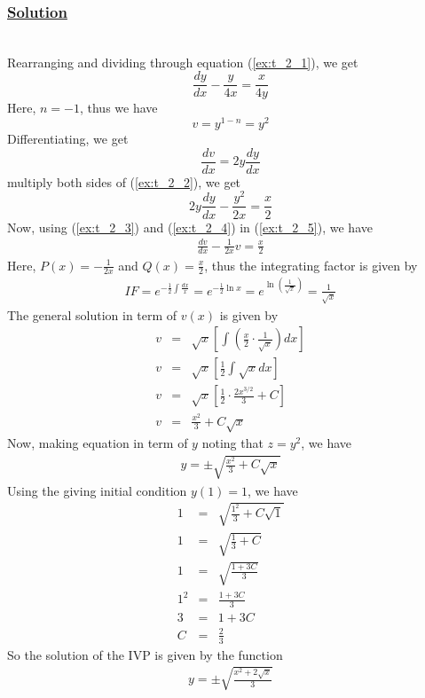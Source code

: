 \documentclass[11pt]{report}
\newcommand{\ubt}[1]{\textbf{\underline{#1}}}
\newcommand{\sps}{\\[0.2cm]}
\newcommand{\spn}[1]{\\[#1cm]}
\newcommand{\refn}[1]{(\ref{#1})}
\newcommand{\solution}{\subsubsection{\ubt{Solution}}{~}\spn{-1}}
\begin{document}
	\solution
	Rearranging and dividing through equation \refn{ex:t_2_1}, we get
	\begin{equation}
		\frac{dy}{dx}  - \frac{y}{4x} = \frac{x}{4y}\tag{2}\label{ex:t_2_2}
	\end{equation}
	Here, $n=-1$, thus we have
	\begin{equation}
		v = y^{1-n} = y^2\tag{3}\label{ex:t_2_3}
	\end{equation}
	Differentiating, we get
	\begin{equation}
		\frac{dv}{dx} = 2y\frac{dy}{dx}\tag{4}\label{ex:t_2_4}
	\end{equation}
	multiply both sides of \refn{ex:t_2_2}, we get
	\begin{equation}
		2y\frac{dy}{dx} - \frac{y^2}{2x} = \frac{x}{2}\tag{5}\label{ex:t_2_5}
	\end{equation}
	Now, using \refn{ex:t_2_3} and \refn{ex:t_2_4} in \refn{ex:t_2_5}, we have
	\begin{eqnarray*}
		\frac{dv}{dx} - \frac{1}{2x}v = \frac{x}{2}
	\end{eqnarray*}
	Here, $P(x) = -\frac{1}{2x}$ and $Q(x)=\frac{x}{2}$, thus the integrating factor is given by
	\begin{eqnarray*}
		IF = e^{-\frac{1}{2}\int\frac{dx}{x}} = e^{-\frac{1}{2}\ln x} = e^{\ln(\frac{1}{\sqrt{x}})} = \frac{1}{\sqrt{x}}
	\end{eqnarray*}
	The general solution in term of $v(x)$ is given by
	\begin{eqnarray*}
		v &=& \sqrt{x}\left[\int \left(\frac{x}{2} \cdot \frac{1}{\sqrt{x}}\right)dx\right] \sps
		v &=& \sqrt{x}\left[\frac{1}{2}\int \sqrt{x}dx\right]\sps
		v &=& \sqrt{x}\left[\frac{1}{2}\cdot \frac{2x^{3/2}}{3}+C\right]\sps
		v & =& \frac{x^2}{3} + C\sqrt{x}
	\end{eqnarray*}
	Now, making equation in term of $y$ noting that $z=y^2$, we have
	\begin{eqnarray*}
		y = \pm\sqrt{\frac{x^2}{3} + C\sqrt{x}}
	\end{eqnarray*}
	Using the giving initial condition $y(1)=1$, we have
	\begin{eqnarray*}
			1 &=& \sqrt{\frac{1^2}{3} + C\sqrt{1}} \sps
			1 &=& \sqrt{\frac{1}{3} + C}\sps
			1 &=& \sqrt{\frac{1+3C}{3}}\sps
			1^2 &=& \frac{1+3C}{3}\sps
			3 &=& 1+3C\sps
			C &=& \frac{2}{3}
	\end{eqnarray*}
	So the solution of the IVP is given by the function
	\begin{eqnarray*}
			y = \pm\sqrt{\frac{x^2 + 2\sqrt{x}}{3}}
	\end{eqnarray*}
\end{document}
